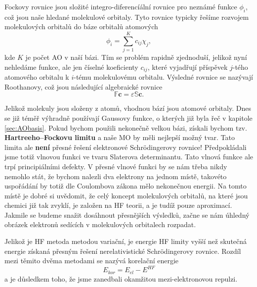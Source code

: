 Fockovy rovnice jsou složité integro-diferencíální rovnice pro neznámé funkce $\phi_i$,
což jsou naše hledané molekulové orbitaly.
Tyto rovnice typicky řešíme rozvojem molekulových orbitalů do báze orbitalů atomových
\begin{equation}
\phi_i=\sum_{j=1}^K c_{ij} \chi_j ,
\end{equation}
kde $K$ je počet AO v naší bázi. Tím se problém rapidně zjednoduší, jelikož nyní nehledáme funkce, ale jen číselné koeficienty $c_{ij}$, které vyjadřují příspěvek $j$-tého atomového orbitalu k $i$-tému molekulovému orbitalu.
Výsledné rovnice se nazývají Roothanovy, což jsou následující algebraické rovnice
\begin{equation}
\mathbb{F} \mathbf{c} = \varepsilon \mathbb{S} \mathbf{c} .
\end{equation}

Jelikož molekuly jsou složeny z atomů, vhodnou bází jsou atomové orbitaly.
Dnes se již téměř výhradně používají Gaussovy funkce, o kterých již byla řeč v kapitole \ref{sec:AObasis}.
Pokud bychom použili nekonečně velkou bázi, získali bychom tzv. \textbf{Hartreeho--Fockovu limitu} a naše MO by měli nejlepší možný tvar. Tato limita ale \textbf{není} přesné řešení elektronové Schr\"{o}dingerovy rovnice!
Předpokládali jsme totiž vlnovou funkci ve tvaru Slaterova determinantu. Tato vlnová funkce ale trpí principiálními defekty. V přesné vlnové funkci by se nám třeba nikdy nemohlo stát, že bychom nalezli dva elektrony na jednom místě, takovéto uspořádání by totiž dle Coulombova zákona mělo nekonečnou energii.
Na tomto místě je dobré si uvědomit, že celý koncept molekulových orbitalů, na které jsou chemici již tak zvyklí, je založen na HF teorii, a je tudíž pouze aproximací. Jakmile se budeme snažit dosáhnout přesnějších výsledků, začne se nám úhledný obrázek elektronů sedících v molekulových orbitalech rozpadat.

Jelikož je HF metoda metodou variační, je energie HF limity vyšší než skutečná energie získaná přesným řešení nerelativistické Schr\"{o}dingerovy rovnice.
Rozdíl mezi těmito dvěma metodami se nazývá korelační energie
\begin{equation}
E_{kor}=E_{el} - E^{HF}
\end{equation}
a je důsledkem toho, že jsme zanedbali okamžitou mezi-elektronovou repulzi.





